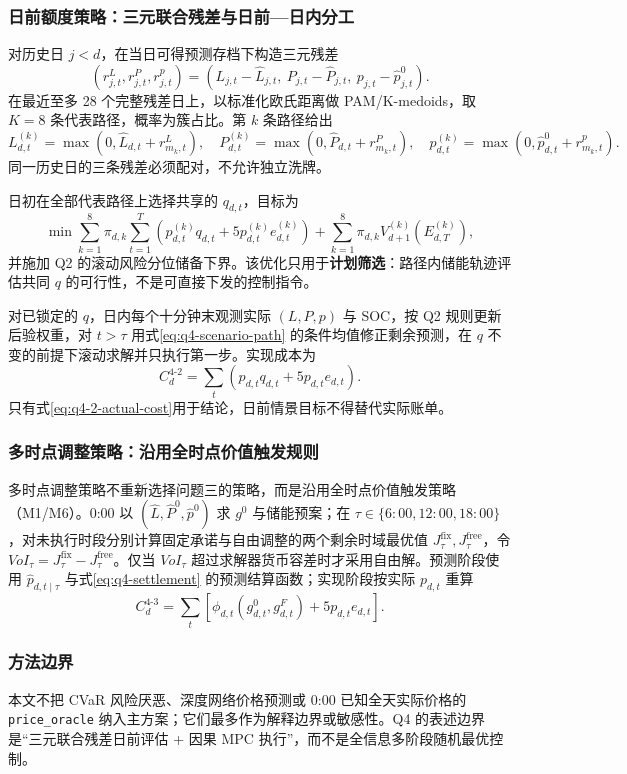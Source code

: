 \subsubsection{日前额度策略：三元联合残差与日前—日内分工}

对历史日 $j<d$，在当日可得预测存档下构造三元残差
\begin{equation}
\left(r^L_{j,t},r^P_{j,t},r^p_{j,t}\right)
=\left(L_{j,t}-\widehat L_{j,t},\ P_{j,t}-\widehat P_{j,t},\ p_{j,t}-\widehat p^0_{j,t}\right).
\label{eq:q4-triple-residual}
\end{equation}
在最近至多 28 个完整残差日上，以标准化欧氏距离做 PAM/K-medoids，取 $K=8$ 条代表路径，概率为簇占比。第 $k$ 条路径给出
\begin{equation}
L^{(k)}_{d,t}=\max(0,\widehat L_{d,t}+r^L_{m_k,t}),\quad
P^{(k)}_{d,t}=\max(0,\widehat P_{d,t}+r^P_{m_k,t}),\quad
p^{(k)}_{d,t}=\max(0,\widehat p^0_{d,t}+r^p_{m_k,t}).
\label{eq:q4-scenario-path}
\end{equation}
同一历史日的三条残差必须配对，不允许独立洗牌\cite{durante}。

日初在全部代表路径上选择共享的 $q_{d,t}$，目标为
\begin{equation}
\min \sum_{k=1}^{8}\pi_{d,k}\sum_{t=1}^{T}
\left(p^{(k)}_{d,t}q_{d,t}+5p^{(k)}_{d,t}e^{(k)}_{d,t}\right)
+\sum_{k=1}^{8}\pi_{d,k}V^{(k)}_{d+1}(E^{(k)}_{d,T}),
\label{eq:q4-2-dayahead}
\end{equation}
并施加 Q2 的滚动风险分位储备下界。该优化只用于\textbf{计划筛选}：路径内储能轨迹评估共同 $q$ 的可行性，不是可直接下发的控制指令。

对已锁定的 $q$，日内每个十分钟末观测实际 $(L,P,p)$ 与 SOC，按 Q2 规则更新后验权重，对 $t>\tau$ 用式\eqref{eq:q4-scenario-path} 的条件均值修正剩余预测，在 $q$ 不变的前提下滚动求解并只执行第一步。实现成本为
\begin{equation}
C^{4\text{-}2}_d=\sum_t\left(p_{d,t}q_{d,t}+5p_{d,t}e_{d,t}\right).
\label{eq:q4-2-actual-cost}
\end{equation}
只有式\eqref{eq:q4-2-actual-cost}用于结论，日前情景目标不得替代实际账单。

\subsubsection{多时点调整策略：沿用全时点价值触发规则}

多时点调整策略不重新选择问题三的策略，而是沿用全时点价值触发策略（M1/M6）。0:00 以 $(\widehat L,\widehat P^0,\widehat p^0)$ 求 $g^0$ 与储能预案；在 $\tau\in\{6{:}00,12{:}00,18{:}00\}$，对未执行时段分别计算固定承诺与自由调整的两个剩余时域最优值 $J^{\mathrm{fix}}_\tau,J^{\mathrm{free}}_\tau$，令 $VoI_\tau=J^{\mathrm{fix}}_\tau-J^{\mathrm{free}}_\tau$。仅当 $VoI_\tau$ 超过求解器货币容差时才采用自由解。预测阶段使用 $\widehat p_{d,t\mid\tau}$ 与式\eqref{eq:q4-settlement} 的预测结算函数；实现阶段按实际 $p_{d,t}$ 重算
\begin{equation}
C^{4\text{-}3}_d=\sum_t\left[\phi_{d,t}(g^0_{d,t},g^F_{d,t})+5p_{d,t}e_{d,t}\right].
\label{eq:q4-3-actual-cost}
\end{equation}

\subsubsection{方法边界}

本文不把 CVaR 风险厌恶、深度网络价格预测或 0:00 已知全天实际价格的 \texttt{price\_oracle} 纳入主方案；它们最多作为解释边界或敏感性。Q4 的表述边界是“三元联合残差日前评估 + 因果 MPC 执行”，而不是全信息多阶段随机最优控制。
